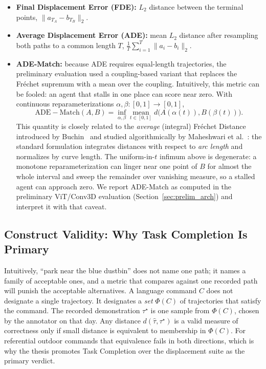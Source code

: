 \begin{itemize}
    \item \textbf{Final Displacement Error (FDE):} $L_2$ distance between the terminal points, $\|a_{T_A}-b_{T_B}\|_2$.
    \item \textbf{Average Displacement Error (ADE):} mean $L_2$ distance after resampling both paths to a common length $T$, $\frac{1}{T}\sum_{i=1}^{T}\|a_i-b_i\|_2$.
    \item \textbf{ADE-Match:} because ADE requires equal-length trajectories, the preliminary evaluation used a coupling-based variant that replaces the Fr\'{e}chet supremum with a mean over the coupling. Intuitively, this metric can be fooled: an agent that stalls in one place can score near zero. With continuous reparameterizations $\alpha,\beta:[0,1]\to[0,1]$,
    \[
    \mathrm{ADE{-}Match}(A,B)=\inf_{\alpha,\beta}\;\underset{t\in[0,1]}{\mathrm{mean}}\; d\bigl(A(\alpha(t)),B(\beta(t))\bigr).
    \]
    This quantity is closely related to the \emph{average} (integral) Fr\'{e}chet Distance introduced by Buchin~\cite{buchin2007frechet} and studied algorithmically by Maheshwari et al.~\cite{maheshwari2015integral}: the standard formulation integrates distances with respect to \emph{arc length} and normalizes by curve length. The uniform-in-$t$ infimum above is degenerate: a monotone reparameterization can linger near one point of $B$ for almost the whole interval and sweep the remainder over vanishing measure, so a stalled agent can approach zero. We report ADE-Match as computed in the preliminary ViT/Conv3D evaluation (Section~\ref{sec:prelim_arch}) and interpret it with that caveat.
\end{itemize}

\subsection{Construct Validity: Why Task Completion Is Primary}
\label{sec:metric_validity}

Intuitively, ``park near the blue dustbin'' does not name one path; it names a family of acceptable ones, and a metric that compares against one recorded path will punish the acceptable alternatives. A language command $C$ does not designate a single trajectory. It designates a \emph{set} $\Phi(C)$ of trajectories that satisfy the command. The recorded demonstration $\tau^\star$ is one sample from $\Phi(C)$, chosen by the annotator on that day. Any distance $d(\hat{\tau},\tau^\star)$ is a valid measure of correctness only if small distance is equivalent to membership in $\Phi(C)$. For referential outdoor commands that equivalence fails in both directions, which is why the thesis promotes Task Completion over the displacement suite as the primary verdict.

